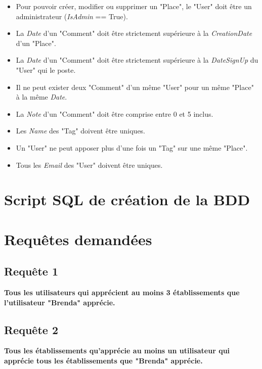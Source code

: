 \documentclass[a4paper,10pt]{article}
\begin{document}
\begin{itemize}
  \item Pour pouvoir créer, modifier ou supprimer un "Place", le "User" doit être un administrateur (\emph{IsAdmin} == True).
  \item La \emph{Date} d'un "Comment" doit être strictement supérieure à la \emph{CreationDate} d'un "Place".
  \item La \emph{Date} d'un "Comment" doit être strictement supérieure à la \emph{DateSignUp} du "User" qui le poste.
  \item Il ne peut exister deux "Comment" d'un même "User" pour un même "Place" à la même \emph{Date}.
  \item La \emph{Note} d'un "Comment" doit être comprise entre 0 et 5 inclus.
  \item Les \emph{Name} des "Tag" doivent être uniques.
  \item Un "User" ne peut apposer plus d'une fois un "Tag" sur une même "Place".
  \item Tous les \emph{Email} des "User" doivent être uniques.
\end{itemize}

\newpage

\section{Script SQL de création de la BDD}



\newpage

\section{Requêtes demandées}

\subsection{Requête 1}

\textbf{Tous les utilisateurs qui apprécient au moins 3 établissements que l’utilisateur "Brenda" apprécie.}

\subsection{Requête 2}

\textbf{Tous les établissements qu’apprécie au moins un utilisateur qui apprécie tous les établissements que "Brenda" apprécie.}
\end{document}
